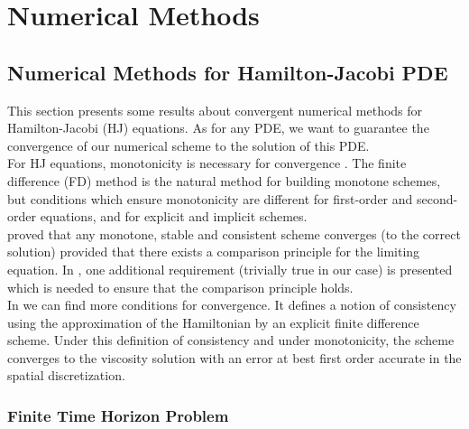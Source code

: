 \chapter{Numerical Methods}

\section{Numerical Methods for Hamilton-Jacobi PDE}

This section presents some results about convergent numerical methods for Hamilton-Jacobi (HJ) equations. 
As for any PDE, we want to guarantee the convergence of our numerical scheme to the solution of this PDE.\\
For HJ equations, monotonicity is necessary for convergence \cite{oberman2006convergent}.
The finite difference (FD) method is the natural method for building monotone schemes, but 
conditions which ensure monotonicity are different for first-order and second-order equations, 
and for explicit and implicit schemes.\\
\cite{barles1991convergence} proved that any monotone, stable and consistent scheme converges 
(to the correct solution) provided that there exists a comparison principle for the limiting 
equation. In \cite{juutinen2001definition}, one additional requirement (trivially true in our case) is presented which is 
needed to ensure that the comparison principle holds.\\
In \cite{souganidis1985approximation} we can find more conditions for convergence. It 
defines a notion of consistency using the approximation of the Hamiltonian by an explicit 
finite difference scheme. Under this definition of consistency and under monotonicity, 
the scheme converges to the viscosity solution with an error at best first order accurate 
in the spatial discretization.

\subsection{Finite Time Horizon Problem}

